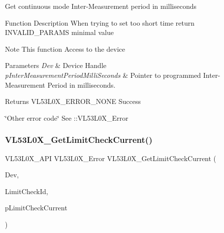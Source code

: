 Get continuous mode Inter-\/\+Measurement period in milliseconds

\begin{DoxyParagraph}{Function Description}
When trying to set too short time return I\+N\+V\+A\+L\+I\+D\+\_\+\+P\+A\+R\+A\+MS minimal value
\end{DoxyParagraph}
\begin{DoxyNote}{Note}
This function Access to the device
\end{DoxyNote}

\begin{DoxyParams}{Parameters}
{\em Dev} & Device Handle \\
\hline
{\em p\+Inter\+Measurement\+Period\+Milli\+Seconds} & Pointer to programmed Inter-\/\+Measurement Period in milliseconds. \\
\hline
\end{DoxyParams}
\begin{DoxyReturn}{Returns}
V\+L53\+L0\+X\+\_\+\+E\+R\+R\+O\+R\+\_\+\+N\+O\+NE Success 

\char`\"{}\+Other error code\char`\"{} See \+::\+V\+L53\+L0\+X\+\_\+\+Error 
\end{DoxyReturn}
\mbox{\label{group__VL53L0X__parameters__group_ga5eba639cd2fe07d87a44f372b8c92e33}} 
\subsubsection{\texorpdfstring{V\+L53\+L0\+X\+\_\+\+Get\+Limit\+Check\+Current()}{VL53L0X\_GetLimitCheckCurrent()}}
{\footnotesize\ttfamily V\+L53\+L0\+X\+\_\+\+A\+PI V\+L53\+L0\+X\+\_\+\+Error V\+L53\+L0\+X\+\_\+\+Get\+Limit\+Check\+Current (\begin{DoxyParamCaption}\item[{\hyperlink{group__VL53L0X__platform__group_ga2d6405308b1dd524b462f1b8fb97d167}{V\+L53\+L0\+X\+\_\+\+D\+EV}}]{Dev,  }\item[{\hyperlink{vl53l0x__types_8h_a273cf69d639a59973b6019625df33e30}{uint16\+\_\+t}}]{Limit\+Check\+Id,  }\item[{\hyperlink{vl53l0x__types_8h_afb910790161809fc76e1a274a6349384}{Fix\+Point1616\+\_\+t} $\ast$}]{p\+Limit\+Check\+Current }\end{DoxyParamCaption})}



